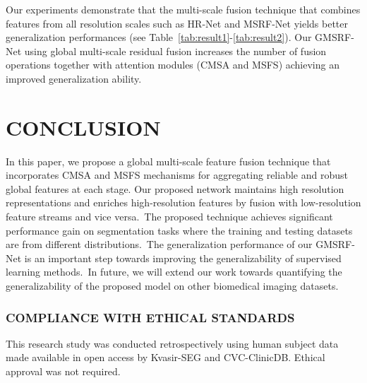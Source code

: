 \documentclass[conference]{IEEEtran}
\begin{document}
Our experiments demonstrate that the multi-scale fusion technique that combines features from all resolution scales such as HR-Net and MSRF-Net yields better generalization performances (see Table~\ref{tab:result1}-\ref{tab:result2}). Our GMSRF-Net using global multi-scale residual fusion increases the number of fusion operations together with attention modules (CMSA and MSFS) achieving an improved generalization ability. 




\section{CONCLUSION}
In this paper, we propose a global multi-scale feature fusion technique that incorporates CMSA and MSFS mechanisms for aggregating reliable and robust global features at each stage. Our proposed network maintains high resolution representations and enriches high-resolution features by fusion with low-resolution feature streams and vice versa.~The proposed technique achieves significant performance gain on segmentation tasks where the training and testing datasets are from different distributions.~The generalization performance of our GMSRF-Net is an important step towards improving the generalizability of supervised learning methods.~In future, we will extend our work towards quantifying the generalizability of the proposed model on other biomedical imaging datasets. 


\small{\subsubsection*{COMPLIANCE WITH ETHICAL STANDARDS}} This research study was conducted retrospectively using human subject data made available in open access by Kvasir-SEG and CVC-ClinicDB. Ethical approval was not required.


\end{document}
